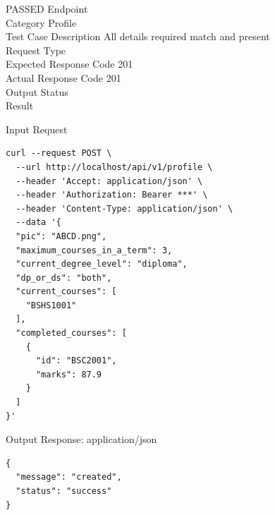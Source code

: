 \begin{testcase}{3}{PASSED}
Endpoint \hfill {}\\
Category \hfill Profile\\
Test Case Description \hfill All details required match and present\\

Request Type    \hfill {}\\
Expected Response Code    \hfill 201\\
Actual Response Code    \hfill 201\\

Output Status \hfill {}\\
Result \hfill {}

\begin{ipblock}{Input Request}
\begin{verbatim}
curl --request POST \
  --url http://localhost/api/v1/profile \
  --header 'Accept: application/json' \
  --header 'Authorization: Bearer ***' \
  --header 'Content-Type: application/json' \
  --data '{
  "pic": "ABCD.png",
  "maximum_courses_in_a_term": 3,
  "current_degree_level": "diploma",
  "dp_or_ds": "both",
  "current_courses": [
    "BSHS1001"
  ],
  "completed_courses": [
    {
      "id": "BSC2001",
      "marks": 87.9
    }
  ]
}'
\end{verbatim}
\end{ipblock}

\begin{opblock}{Output Response: application/json}
\begin{verbatim}
{
  "message": "created",
  "status": "success"
}
\end{verbatim}
\end{opblock}
\end{testcase}

